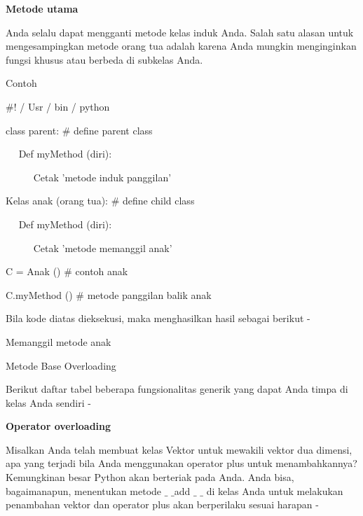 \begin {enumerate}
\vspace{12pt}
\noindent 
{\fontsize{14pt}{14pt}\selectfont \textbf{Metode utama} \\} \par
\vspace{12pt}
Anda selalu dapat mengganti metode kelas induk Anda. Salah satu alasan untuk mengesampingkan metode orang tua adalah karena Anda mungkin menginginkan fungsi khusus atau berbeda di subkelas Anda. \par
Contoh \par
\vspace{12pt}
\noindent 
 $  \#  $! / Usr / bin / python \par
\vspace{12pt}
\noindent 
class parent:  $  \#  $ define parent class \par
\noindent 
~~ Def myMethod (diri): \par
\noindent 
~~~~~ Cetak 'metode induk panggilan' \par
\vspace{12pt}
\noindent 
Kelas anak (orang tua):  $  \#  $ define child class \par
\noindent 
~~ Def myMethod (diri): \par
\noindent 
~~~~~ Cetak 'metode memanggil anak' \par
\vspace{12pt}
\noindent 
C = Anak ()  $  \#  $ contoh anak \par
\noindent 
C.myMethod ()  $  \#  $ metode panggilan balik anak \par
\vspace{12pt}
\noindent 
Bila kode diatas dieksekusi, maka menghasilkan hasil sebagai berikut - \par
\vspace{12pt}
\noindent 
Memanggil metode anak \par
\vspace{12pt}
\noindent 
Metode Base Overloading \par
\vspace{12pt}
\noindent 
Berikut daftar tabel beberapa fungsionalitas generik yang dapat Anda timpa di kelas Anda sendiri - \par
\vspace{14pt}
\noindent 
{\fontsize{14pt}{14pt}\selectfont \textbf{Operator overloading} \\} \par
\vspace{12pt}
Misalkan Anda telah membuat kelas Vektor untuk mewakili vektor dua dimensi, apa yang terjadi bila Anda menggunakan operator plus untuk menambahkannya? Kemungkinan besar Python akan berteriak pada Anda. Anda bisa, bagaimanapun, menentukan metode  $  \_  $ $  \_  $add $  \_  $ $  \_  $ di kelas Anda untuk melakukan penambahan vektor dan operator plus akan berperilaku sesuai harapan - \par

\end{enumerate}
